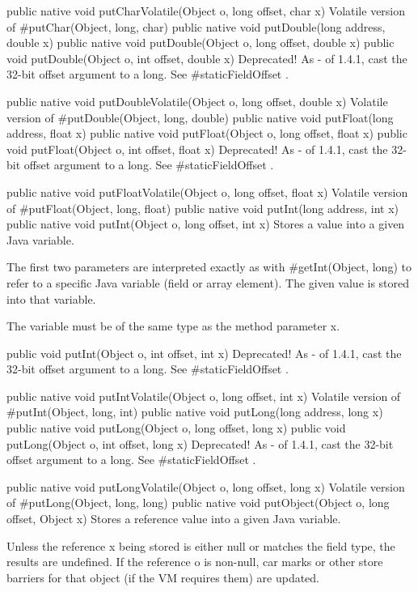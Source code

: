  public native  void putCharVolatile(Object o,
    long offset,
    char x)
Volatile version of #putChar(Object, long, char) 
 public native  void putDouble(long address,
    double x)
 public native  void putDouble(Object o,
    long offset,
    double x)
 public  void putDouble(Object o,
    int offset,
    double x) 
Deprecated! As - of 1.4.1, cast the 32-bit offset argument to a long. See #staticFieldOffset .

 public native  void putDoubleVolatile(Object o,
    long offset,
    double x)
Volatile version of #putDouble(Object, long, double) 
 public native  void putFloat(long address,
    float x)
 public native  void putFloat(Object o,
    long offset,
    float x)
 public  void putFloat(Object o,
    int offset,
    float x) 
Deprecated! As - of 1.4.1, cast the 32-bit offset argument to a long. See #staticFieldOffset .

 public native  void putFloatVolatile(Object o,
    long offset,
    float x)
Volatile version of #putFloat(Object, long, float) 
 public native  void putInt(long address,
    int x)
 public native  void putInt(Object o,
    long offset,
    int x)
Stores a value into a given Java variable.

The first two parameters are interpreted exactly as with
#getInt(Object, long)  to refer to a specific
Java variable (field or array element).  The given value
is stored into that variable.


The variable must be of the same type as the method
parameter x.

 public  void putInt(Object o,
    int offset,
    int x) 
Deprecated! As - of 1.4.1, cast the 32-bit offset argument to a long. See #staticFieldOffset .

 public native  void putIntVolatile(Object o,
    long offset,
    int x)
Volatile version of #putInt(Object, long, int) 
 public native  void putLong(long address,
    long x)
 public native  void putLong(Object o,
    long offset,
    long x)
 public  void putLong(Object o,
    int offset,
    long x) 
Deprecated! As - of 1.4.1, cast the 32-bit offset argument to a long. See #staticFieldOffset .

 public native  void putLongVolatile(Object o,
    long offset,
    long x)
Volatile version of #putLong(Object, long, long) 
 public native  void putObject(Object o,
    long offset,
    Object x)
Stores a reference value into a given Java variable.

Unless the reference x being stored is either null
or matches the field type, the results are undefined.
If the reference o is non-null, car marks or
other store barriers for that object (if the VM requires them)
are updated.

